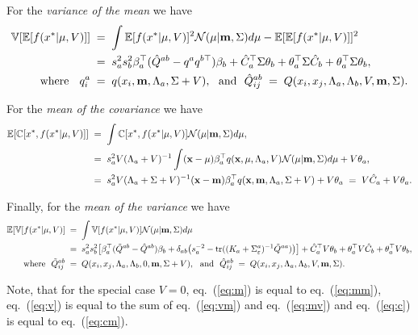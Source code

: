 \documentclass{article}
\newcommand{\bfm}{{\bf m}}
\newcommand{\bfx}{{\bf x}}
\newcommand{\E}{{\mathbb E}}
\newcommand{\V}{{\mathbb V}}
\newcommand{\C}{{\mathbb C}}
\begin{document}
For the \emph{variance of the mean} we have
\begin{equation}
\begin{split}
\V[\E[f(x^*|\mu,V)]]\;&=\;\int \E[f(x^*|\mu,V)]^2{\cal
  N}(\mu|\bfm,\Sigma)d\mu-\E[\E[f(x^*|\mu,V)]]^2\\
&=\;s_a^2s_b^2\beta_a^\top(\hat Q^{ab}-q^a
q^{b\top})\beta_b+\hat C_a^\top\Sigma\theta_b+\theta_a^\top\Sigma\hat C_b+\theta_a^\top\Sigma\theta_b,\\
\text{where\ \ }\;q^a_i\;&=\;q(x_i,\bfm,\Lambda_a,\Sigma+V), \text{\ \ and\  \ }
\hat Q_{ij}^{ab}\;=\;Q(x_i,x_j,\Lambda_a,\Lambda_b,V,\bfm,\Sigma).
\label{eq:vm}
\end{split}
\end{equation}

For the \emph{mean of the covariance} we have  
\begin{equation}
\begin{split}
\E[\C[x^*,f(x^*|\mu,V)]]\;&=\;\int\C[x^*,f(x^*|\mu,V)]{\cal N}(\mu|\bfm,\Sigma)d\mu,\\
&=\; s^2_aV(\Lambda_a+V)^{-1} \int (\bfx-\mu)\beta_a^\top q(\bfx,\mu,\Lambda_a,V){\cal N}(\mu|\bfm,\Sigma)d\mu+V\theta_a,\\
&=\; s^2_aV(\Lambda_a+\Sigma+V)^{-1}(\bfx-\bfm)\beta_a^\top q(\bfx,\bfm,\Lambda_a,\Sigma+V) +V\theta_a\;=\;
V\hat C_a+V\theta_a.
\end{split}
\label{eq:mc}
\end{equation}

Finally, for the \emph{mean of the variance} we have 
\begin{align}
\E[\V[f(x^*|\mu,V)]\;&=\;\int\V[f(x^*|\mu,V)]{\cal N}(\mu|\bfm,\Sigma)d\mu\label{eq:mv}\\
&=\;s_a^2s_b^2\big[\beta_a^\top (\tilde Q^{ab}-\hat Q^{ab})\beta_b+
\delta_{ab}\big(s_a^{-2}-\operatorname{tr}((K_a+\Sigma_\varepsilon^a)^{-1}\tilde
Q^{aa})\big)\big]+\hat C_a^\top V\theta_b+\theta_a^\top V\hat C_b+\theta_a^\top V\theta_b,\nonumber\\
\text{where\ \ }
\tilde Q_{ij}^{ab}\;&=\;Q(x_i,x_j,\Lambda_a,\Lambda_b,0,\bfm,\Sigma+V),
\text{\ \  and\ \ }
\hat Q_{ij}^{ab}\;=\;Q(x_i,x_j,\Lambda_a,\Lambda_b,V,\bfm,\Sigma).\nonumber
\end{align}

Note, that for the special case $V=0$, eq.~(\ref{eq:m}) is equal to
eq.~(\ref{eq:mm}), eq.~(\ref{eq:v}) is equal to the sum of
eq.~(\ref{eq:vm}) and eq.~(\ref{eq:mv}) and eq.~(\ref{eq:c}) is equal to eq.~(\ref{eq:cm}).
\end{document}
